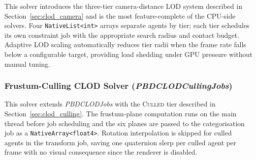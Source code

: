 This solver introduces the three-tier camera-distance LOD system described in
Section~\ref{sec:clod_camera} and is the most feature-complete of the CPU-side
solvers.  Four \texttt{NativeList<int>} arrays separate agents by tier; each
tier schedules its own constraint job with the appropriate search radius and
contact budget.  Adaptive LOD scaling automatically reduces tier radii when
the frame rate falls below a configurable target, providing load shedding under
GPU pressure without manual tuning.

\subsubsection{Frustum-Culling CLOD Solver (\textit{PBDCLODCullingJobs})}

This solver extends \textit{PBDCLODJobs} with the \textsc{Culled} tier
described in Section~\ref{sec:clod_culling}.  The frustum-plane computation
runs on the main thread before job scheduling and the six planes are passed to
the categorisation job as a \texttt{NativeArray<float4>}.  Rotation
interpolation is skipped for culled agents in the transform job, saving one
quaternion slerp per culled agent per frame with no visual consequence since
the renderer is disabled.